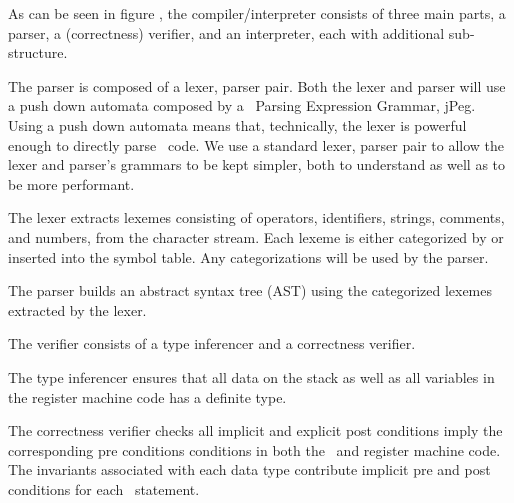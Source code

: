 As can be seen in figure , the compiler/interpreter 
consists of three main parts, a parser, a (correctness) verifier, and an 
interpreter, each with additional sub-structure. 

\startitemize[1]

\item {}

The parser is composed of a lexer, parser pair. Both the lexer and parser 
will use a push down automata composed by a \joylol\ Parsing Expression 
Grammar, jPeg. Using a push down automata means that, technically, the 
lexer is powerful enough to directly parse \joylol\ code. We use a 
standard lexer, parser pair to allow the lexer and parser's grammars to be 
kept simpler, both to understand as well as to be more performant. 

\startitemize[2]

\item {}

The lexer extracts lexemes consisting of operators, identifiers, strings, 
comments, and numbers, from the character stream. Each lexeme is either 
categorized by or inserted into the symbol table. Any categorizations will 
be used by the parser. 

\item {}

The parser builds an abstract syntax tree (AST) using the categorized 
lexemes extracted by the lexer. 

\stopitemize

\item {}

The verifier consists of a type inferencer and a correctness verifier. 

\startitemize[2]

\item {}

The type inferencer ensures that all data on the stack as well as all 
variables in the register machine code has a definite type. 

\item {}

The correctness verifier checks all implicit and explicit post conditions 
imply the corresponding pre conditions conditions in both the \joylol\ and 
register machine code. The invariants associated with each data type 
contribute implicit pre and post conditions for each \joylol\ statement. 

